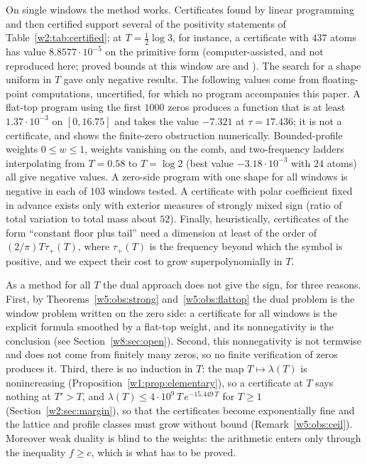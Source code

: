 \documentclass[11pt]{amsart}
\theoremstyle{definition}
\theoremstyle{remark}
\numberwithin{equation}{section}
\newcommand{\lam}{\lambda(T)}                          %
\begin{document}
On single windows the method works. Certificates found by linear programming and then certified support several of the
positivity statements of Table~\ref{w2:tab:certified}; at $T=\frac12\log3$, for instance, a certificate with $437$ atoms
has value $8.8577\cdot10^{-5}$ on the primitive form (computer-assisted, and not reproduced here; proved bounds at this window
are \cite[Theorem~9.18]{P42} and \cite[Theorem~9.1]{P46}). The search for a shape uniform in $T$ gave only negative
results. The following values come from floating-point computations, uncertified, for which no program accompanies this
paper. A flat-top program using the first $1000$ zeros produces a function that is at least $1.37\cdot10^{-3}$ on
$[0,16.75]$ and takes the value $-7.321$ at $\tau=17.436$; it is not a certificate, and shows the finite-zero
obstruction numerically. Bounded-profile weights $0\le w\le1$, weights vanishing on the comb, and two-frequency ladders
interpolating from $T=0.58$ to $T=\log2$ (best value $-3.18\cdot10^{-3}$ with $24$ atoms) all give negative values. A
zero-side program with one shape for all windows is negative in each of $103$ windows tested. A certificate with polar
coefficient fixed in advance exists only with exterior measures of strongly mixed sign (ratio of total variation to
total mass about $52$). Finally, heuristically, certificates of the form ``constant floor plus tail'' need a dimension
at least of the order of $(2/\pi)T\tau_+(T)$, where $\tau_+(T)$ is the frequency beyond which the symbol is positive,
and we expect their cost to grow superpolynomially in $T$.

As a method for all $T$ the dual approach does not give the sign, for three reasons. First, by
Theorems~\ref{w5:obs:strong} and~\ref{w5:obs:flattop} the dual problem is the window problem written on the zero side: a
certificate for all windows is the explicit formula smoothed by a flat-top weight, and its nonnegativity is the
conclusion (see Section~\ref{w8:sec:open}). Second, this nonnegativity is not termwise and does not come from finitely
many zeros, so no finite verification of zeros produces it. Third, there is no induction in $T$: the map $T\mapsto\lam$
is nonincreasing (Proposition~\ref{w1:prop:elementary}), so a certificate at $T$ says nothing at $T'>T$, and
$\lam\le4\cdot10^9\,T\,e^{-15.449\,T}$ for $T\ge1$ \cite[Corollary~9.11]{P46} (Section~\ref{w2:sec:margin}), so that
the certificates become exponentially fine and the lattice and profile classes must grow without bound
(Remark~\ref{w5:obs:ceil}). Moreover weak duality is blind to the weights: the arithmetic enters only through the
inequality $f\ge c$, which is what has to be proved.
\end{document}
